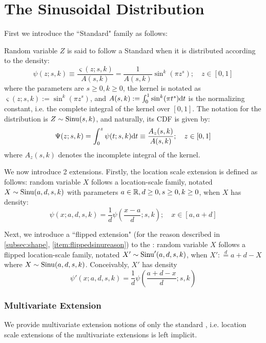 
\section{The Sinusoidal Distribution}
First we introduce the ``Standard" \sindist{} family as follows:

Random variable $Z$ is said to follow a Standard \sindist{} when it is distributed according to the density:
\begin{equation}
    \boxed{\psi(z; s,k) \equiv \frac{\varsigma(z; s,k)}{A(s,k)} = \frac{1}{A(s,k)} \sin^k(\pi z^s); \quad z \in [0,1]}
\end{equation}
where the parameters are $s \ge 0, k \ge 0$, the kernel is notated as $\varsigma(z; s,k) := \sin^k(\pi z^s)$, and $A(s,k) := \int_0^1 \sin^k(\pi t^s) \mathrm d t$ is the normalizing constant, i.e. the complete integral of the kernel over $[0,1]$. The notation for the distribution is $Z \sim \operatorname*{Sinu}(s,k)$, and naturally, its CDF is given by:
\begin{equation}
    \Psi(z; s,k) = \int_0^z \psi(t; s,k) \mathrm d t \equiv \frac{A_z(s,k)}{A(s,k)}; \quad z\in[0,1]
\end{equation}
where $A_z(s,k)$ denotes the incomplete integral of the kernel.

We now introduce 2 extensions. Firstly, the location scale extension is defined as follows: random variable $X$ follows a location-scale \sindist{} family, notated $X \sim \operatorname*{Sinu}(a,d,s,k)$ with parameters $a \in \mathbb R, d \ge 0, s \ge 0, k\ge 0$, when $X$ has density:
\begin{equation}
    \psi(x; a,d,s,k) = {\frac 1 d} \psi \left( \frac{x-a}{d}; s,k \right);  \quad x \in [a, a+d]
\end{equation}

Next, we introduce a ``flipped extension" (for the reason described in \autoref{subsec:shape}, \autoref{item:flippedsinureason}) to the \sindist: random variable $X$ follows a flipped location-scale \sindist{} family, notated $X' \sim \operatorname*{Sinu}'(a,d,s,k)$, when $X' :\overset{d}{=} a+d - X$ where $X \sim \operatorname*{Sinu}(a,d,s,k)$. Conceivably, $X'$ has density
\begin{equation}
    \psi'(x; a,d,s,k) = {\frac 1 d} \psi \left( \frac{a+d-x}{d}; s,k \right)
\end{equation}

\subsubsection*{Multivariate Extension}
We provide multivariate extension notions of only the standard \sindist{}, i.e. location scale extensions of the multivariate extensions is left implicit.

